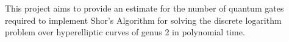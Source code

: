  This project aims to provide an estimate for the number of quantum gates required to implement Shor's Algorithm for solving the discrete logarithm problem over hyperelliptic curves of genus 2 in polynomial time.